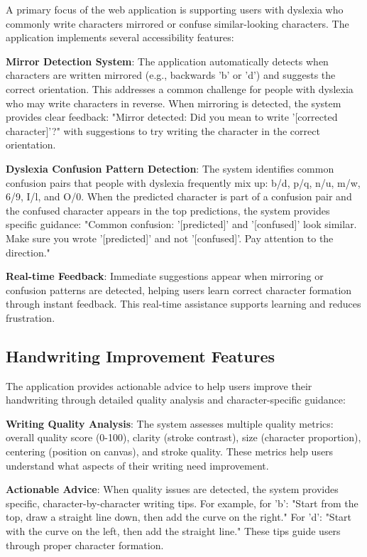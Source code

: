 \documentclass[11pt,a4paper]{report}
\begin{document}
A primary focus of the web application is supporting users with dyslexia who commonly write characters mirrored or confuse similar-looking characters. The application implements several accessibility features:

\textbf{Mirror Detection System}: The application automatically detects when characters are written mirrored (e.g., backwards 'b' or 'd') and suggests the correct orientation. This addresses a common challenge for people with dyslexia who may write characters in reverse. When mirroring is detected, the system provides clear feedback: "Mirror detected: Did you mean to write '[corrected character]'?" with suggestions to try writing the character in the correct orientation.

\textbf{Dyslexia Confusion Pattern Detection}: The system identifies common confusion pairs that people with dyslexia frequently mix up: b/d, p/q, n/u, m/w, 6/9, I/l, and O/0. When the predicted character is part of a confusion pair and the confused character appears in the top predictions, the system provides specific guidance: "Common confusion: '[predicted]' and '[confused]' look similar. Make sure you wrote '[predicted]' and not '[confused]'. Pay attention to the direction."

\textbf{Real-time Feedback}: Immediate suggestions appear when mirroring or confusion patterns are detected, helping users learn correct character formation through instant feedback. This real-time assistance supports learning and reduces frustration.

\subsection{Handwriting Improvement Features}

The application provides actionable advice to help users improve their handwriting through detailed quality analysis and character-specific guidance:

\textbf{Writing Quality Analysis}: The system assesses multiple quality metrics: overall quality score (0-100), clarity (stroke contrast), size (character proportion), centering (position on canvas), and stroke quality. These metrics help users understand what aspects of their writing need improvement.

\textbf{Actionable Advice}: When quality issues are detected, the system provides specific, character-by-character writing tips. For example, for 'b': "Start from the top, draw a straight line down, then add the curve on the right." For 'd': "Start with the curve on the left, then add the straight line." These tips guide users through proper character formation.
\end{document}
